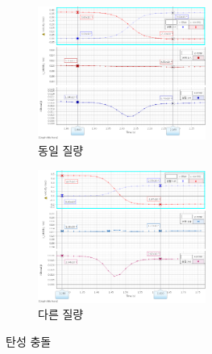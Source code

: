 \documentclass[12pt,a4paper]{article}
\begin{document}
\begin{figure}[!h]
    \centering
    \begin{subfigure}[]{0.4\textwidth}
        \includegraphics[height=4.36cm]{W10_3-A.png}
        \caption{\label{fig3-A}동일 질량}
    \end{subfigure}
    \begin{subfigure}[]{0.4\textwidth}
        \includegraphics[height=4.36cm]{W10_3-B.png}
        \caption{\label{fig3-B}다른 질량}
    \end{subfigure}
    \caption{\label{fig3}탄성 충돌}
\end{figure}
\end{document}
